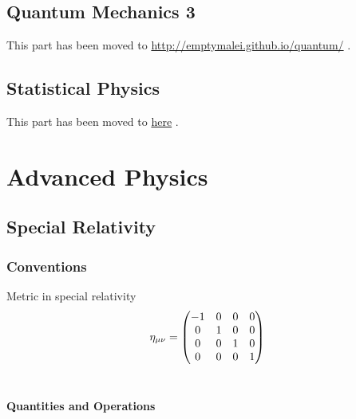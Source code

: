 \documentclass[letterpaper,10pt,english]{sphinxmanual}
\begin{document}
\section{Quantum Mechanics 3}
\label{QuantumMechanics3:quantum-mechanics-3}\label{QuantumMechanics3::doc}
This part has been moved to \href{http://emptymalei.github.io/quantum/}{http://emptymalei.github.io/quantum/} .


\section{Statistical Physics}
\label{statmech/StatisticalPhysics::doc}\label{statmech/StatisticalPhysics:statistical-physics}
This part has been moved to \href{http://emptymalei.github.io/StatisticalPhysics/}{here} .


\chapter{Advanced Physics}
\label{index:advanced-physics}

\section{Special Relativity}
\label{relativity/SpecialRelativity::doc}\label{relativity/SpecialRelativity:special-relativity}

\subsection{Conventions}
\label{relativity/SpecialRelativity:conventions}
Metric in special relativity
\begin{gather}
\begin{split}\eta_{\mu\nu}=\begin{pmatrix}
     -1 & 0 & 0 & 0\\
     0 & 1 & 0 & 0\\
     0 & 0 & 1 & 0\\
     0 & 0 & 0 & 1\\
\end{pmatrix}\end{split}\notag\\\begin{split}\end{split}\notag
\end{gather}

\subsubsection{Quantities and Operations}
\label{relativity/SpecialRelativity:quantities-and-operations}
\end{document}

